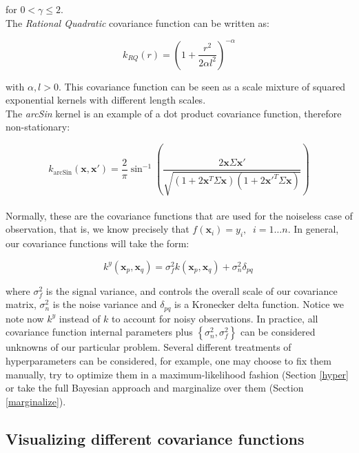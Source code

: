 \documentclass[10pt,a4paper,twoside]{book}
\begin{document}
for $0 < \gamma \leq 2$. \\

The \textit{Rational Quadratic} covariance function can be written as:

\begin{equation}
k_{RQ}(r) = \left( 1 + \dfrac{r^2}{2\alpha l^2} \right)^{-\alpha}
\end{equation}

with $\alpha, l > 0$. This covariance function can be seen as a scale mixture of squared exponential kernels with different length scales.\\


The \textit{arcSin} kernel is an example of a dot product covariance function, therefore non-stationary:

\begin{equation}
k_{\textrm{arcSin}}(\boldsymbol{x}, \boldsymbol{x'}) = \dfrac{2}{\pi}\sin^{-1}\left(\dfrac{2\boldsymbol{x}\Sigma\boldsymbol{x'}}{\sqrt{(1 + 2\boldsymbol{x}^T\Sigma\boldsymbol{x})(1 + 2\boldsymbol{x'}^T\Sigma\boldsymbol{x})}}   \right)
\end{equation}\\

Normally, these are the covariance functions that are used for the noiseless case of observation, that is, we know precisely that $f(\boldsymbol{x}_i) = y_i, \;\; i=1\dots n$. In general, our covariance functions will take the form:

\begin{equation}
k^y(\boldsymbol{x}_p, \boldsymbol{x}_q) = \sigma^2_f k(\boldsymbol{x}_p, \boldsymbol{x}_q) + \sigma^2_n \delta_{pq} \,
\end{equation}

where $\sigma^2_f$ is the signal variance, and controls the overall scale of our covariance matrix, $\sigma^2_n$ is the noise variance and $\delta_{pq}$ is a Kronecker delta function. Notice we note now $k^y$ instead of $k$ to account for noisy observations. In practice, all covariance function internal parameters plus $\left\lbrace\sigma_n^2, \sigma^2_f\right\rbrace$ can be considered unknowns of our particular problem. Several different treatments of hyperparameters can be considered, for example, one may choose to fix them manually, try to optimize them in a maximum-likelihood fashion (Section \ref{hyper} or take the full Bayesian approach and marginalize over them (Section \ref{marginalize}).


\subsection{Visualizing different covariance functions}
\end{document}
